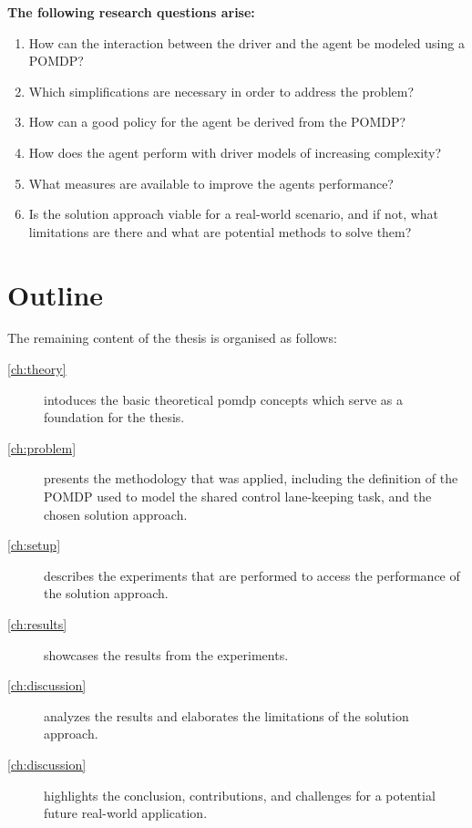 \vspace{1em}
\noindent
\textbf{The following research questions arise:}
\begin{enumerate}
    \item How can the interaction between the driver and the agent be modeled using a POMDP?
    \item Which simplifications are necessary in order to address the problem?
    \item How can a good policy for the agent be derived from the POMDP?
    \item How does the agent perform with driver models of increasing complexity?
    \item What measures are available to improve the agents performance?
    \item Is the solution approach viable for a real-world scenario, and if not, what limitations are there and what are potential methods to solve them?
\end{enumerate}


\section{Outline}

The remaining content of the thesis is organised as follows:
\begin{description}
    \item[\cref{ch:theory}] intoduces the basic theoretical \gls{pomdp} concepts which serve as a foundation for the thesis.

    \item[\cref{ch:problem}]
    presents the methodology that was applied, including the definition of the POMDP used to model the shared control lane-keeping task, and the chosen solution approach.
    
    \item[\cref{ch:setup}]
    describes the experiments that are performed to access the performance of the solution approach.
    
    \item[\cref{ch:results}]
    showcases the results from the experiments.

    \item[\cref{ch:discussion}]
    analyzes the results and elaborates the limitations of the solution approach.

    \item[\cref{ch:discussion}]
    highlights the conclusion, contributions, and challenges for a potential future real-world application.

\end{description}